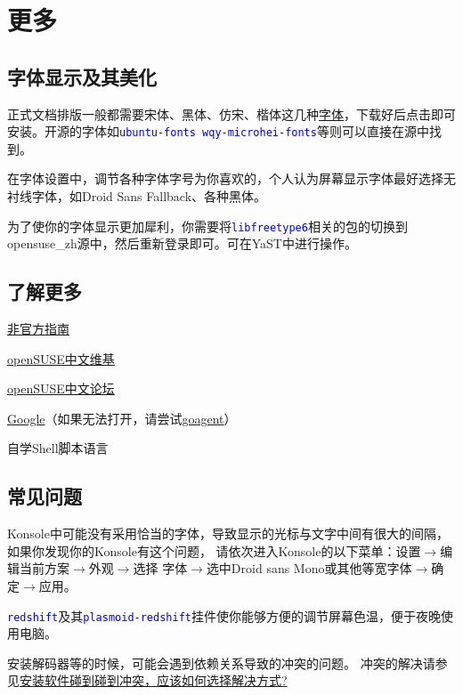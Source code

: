 \documentclass[10pt,openany]{book}
\newcommand{\soft}[1]{\texttt{\textcolor{blue}{#1}}}
\begin{document}
\chapter{更多}
\section{字体显示及其美化}
正式文档排版一般都需要宋体、黑体、仿宋、楷体这几种\href{http://pan.baidu.com/s/1mgiHWmO}{字体}，下载好后点击即可安装。开源的字体如\soft{ubuntu-fonts wqy-microhei-fonts}等则可以直接在源中找到。

在字体设置中，调节各种字体字号为你喜欢的，个人认为屏幕显示字体最好选择无衬线字体，如Droid Sans Fallback、各种黑体。

为了使你的字体显示更加犀利，你需要将\soft{libfreetype6}相关的包的切换到opensuse\_zh源中，然后重新登录即可。可在YaST中进行操作。

\section{了解更多}
\begin{compactitem}
 \item \href{https://lug.ustc.edu.cn/sites/opensuse-guide/}{非官方指南}
 \item \href{https://zh.opensuse.org/%E9%A6%96%E9%A1%B5}{openSUSE中文维基}
 \item \href{https://forum.suse.org.cn/}{openSUSE中文论坛}
 \item \href{https://google.com}{Google}（如果无法打开，请尝试\href{https://code.google.com/p/goagent/}{goagent}）
 \item 自学Shell脚本语言
\end{compactitem}
\section{常见问题}
Konsole中可能没有采用恰当的字体，导致显示的光标与文字中间有很大的间隔，如果你发现你的Konsole有这个问题，
请依次进入Konsole的以下菜单：设置$\rightarrow$编辑当前方案$\rightarrow$外观$\rightarrow$选择
字体$\rightarrow$选中Droid sans Mono或其他等宽字体$\rightarrow$确定$\rightarrow$应用。

\soft{redshift}及其\soft{plasmoid-redshift}挂件使你能够方便的调节屏幕色温，便于夜晚使用电脑。

安装解码器等的时候，可能会遇到依赖关系导致的冲突的问题。
冲突的解决请参见\href{https://forum.suse.org.cn/viewtopic.php?t=2867&p=22491#p22491}{安装软件碰到碰到冲突，应该如何选择解决方式?}
\end{document}

